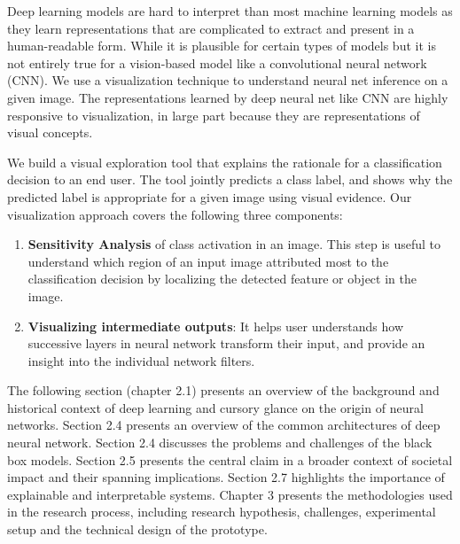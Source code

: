 Deep learning models are hard to interpret than most machine learning models as they learn representations that are complicated to extract and present in a human-readable form.  While it is plausible for certain types of models but it is  not entirely true for a vision-based model like a convolutional neural network (CNN).  We use a visualization technique to understand neural net inference on a given image.  The representations learned by deep neural net like CNN are highly responsive to visualization, in large part because they are representations of visual concepts.

We build a visual exploration tool that explains the rationale for a classification decision to an end user. The tool jointly predicts a class label,  and shows why the predicted label is appropriate for a given image using visual evidence. Our visualization approach covers the following three components:

\begin{enumerate}
\item \textbf{Sensitivity Analysis} of class activation in an image. This step is useful to understand which region of an input image attributed most to the classification decision by localizing the detected feature or object in the image.


\item  \textbf{Visualizing intermediate outputs}: It helps user understands how successive layers in neural network transform their input, and provide an insight into the individual network filters.

\end{enumerate}

The following section (chapter 2.1) presents an overview of the background and historical context of deep learning and cursory glance on the origin of neural networks.  Section 2.4 presents an overview of the common architectures of deep neural network.  Section 2.4 discusses the problems and challenges of the black box models. Section 2.5 presents the central claim in a broader context of societal impact and their spanning implications. Section 2.7 highlights the importance of explainable and interpretable systems.  Chapter 3 presents the methodologies used in the research process, including research hypothesis, challenges, experimental setup and the technical design of the prototype.

